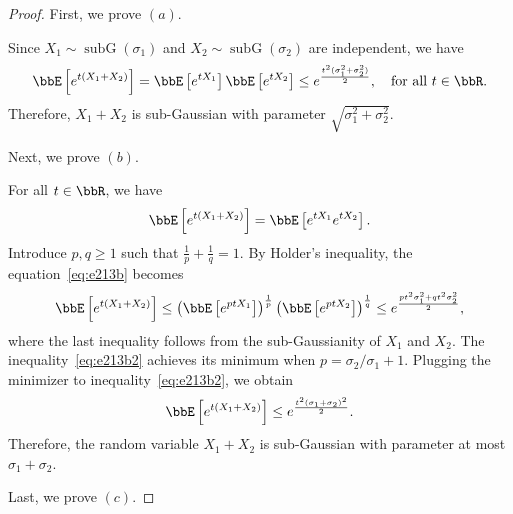 \documentclass[11pt]{article}
\DeclareMathOperator{\subG}{subG}
\newcommand{\of}[1]{\left(#1\right)}
\newcommand{\off}[1]{\left[#1\right]}
\theoremstyle{plain}
\theoremstyle{definition}
\begin{document}
\begin{proof}
	First, we prove $(a)$.
	
	\vspace{0.2cm}
	Since $X_1\sim \subG(\sigma_1)$ and $X_2 \sim \subG(\sigma_2)$ are independent, we have
	\begin{equation}
		\bbE\off{e^{t(X_1 + X_2)}} = \bbE\off{e^{tX_1}} \bbE\off{e^{tX_2}} \leq e^{\frac{t^2(\sigma_1^2 + \sigma_2^2)}{2}},\quad \text{for all }t \in \bbR.
	\end{equation}
	Therefore, $X_1 +X_2$ is sub-Gaussian with parameter $\sqrt{\sigma_1^2 + \sigma_2^2}$.
	
	\vspace{0.2cm}
Next, we prove $(b)$.

\vspace{0.2cm}
For all $t \in \bbR$, we have
\begin{equation}\label{eq:e213b}
	\bbE\off{e^{t(X_1 + X_2)}} = \bbE \off{e^{t X_1} e^{t X_2}}.
\end{equation}
Introduce $p,q \geq 1$ such that $\frac{1}{p} + \frac{1}{q} = 1$. By Holder's inequality, the equation~\eqref{eq:e213b} becomes
\begin{equation}\label{eq:e213b2}
	\bbE\off{e^{t(X_1 + X_2)}} \leq \of{\bbE \off{e^{ p t X_1}  } }^{\frac{1}{p}}
	 \of{\bbE \off{e^{ pt X_2}  }}^{\frac{1}{q}} \leq e^{  \frac{pt^2 \sigma_1^2 + qt^2 \sigma_2^2}{2} },
\end{equation}
where the last inequality follows from the sub-Gaussianity of $X_1$ and $X_2$. The inequality~\eqref{eq:e213b2} achieves its minimum when $p = \sigma_2/\sigma_1 +1$. Plugging the minimizer to inequality~\eqref{eq:e213b2}, we obtain
\begin{equation}
	\bbE\off{e^{t(X_1 + X_2)}} \leq e^{\frac{t^2(\sigma_1 + \sigma_2
	)^2}{2}}.
\end{equation}
Therefore, the random variable $X_1 + X_2$ is sub-Gaussian with parameter at most $\sigma_1 + \sigma_2$.

\vspace{0.2cm}

Last, we prove $(c)$.

\vspace{0.2cm}

\end{proof}
\end{document}
